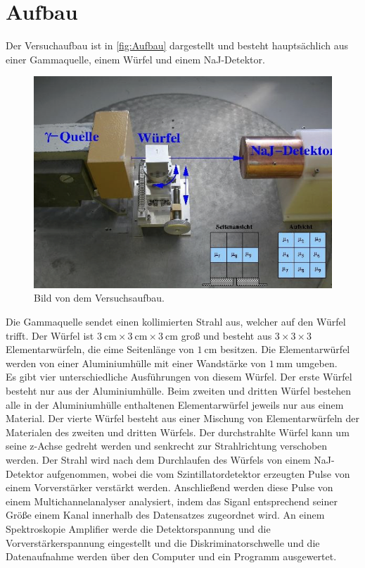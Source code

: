 \section{Aufbau}
\label{sec:Aufbau}
Der Versuchaufbau ist in \autoref{fig:Aufbau} dargestellt und besteht hauptsächlich aus einer Gammaquelle, einem Würfel und einem NaJ-Detektor.
\begin{figure}[H]
    \centering
    \includegraphics[scale=0.7]{Abbildungen/Aufbau.png}
    \caption{Bild von dem Versuchsaufbau.\cite{V14}}
    \label{fig:Aufbau}
\end{figure}
Die Gammaquelle sendet einen kollimierten Strahl aus, welcher auf den Würfel trifft. 
Der Würfel ist $\qty{3}{\centi\meter} \times \qty{3}{\centi\meter} \times \qty{3}{\centi\meter}$ groß und besteht aus $3 \times 3 \times 3$ Elementarwürfeln, die eime Seitenlänge
von $\qty{1}{\centi\meter}$ besitzen. Die Elementarwürfel werden von einer Aluminiumhülle mit einer Wandstärke von $\qty{1}{\milli\meter}$ umgeben.\\
Es gibt vier unterschiedliche Ausführungen von diesem Würfel. Der erste Würfel besteht nur aus der Aluminiumhülle.
Beim zweiten und dritten Würfel bestehen alle in der Aluminiumhülle enthaltenen Elementarwürfel jeweils nur aus einem Material. Der vierte Würfel besteht aus
einer Mischung von Elementarwürfeln der Materialen des zweiten und dritten Würfels.
Der durchstrahlte Würfel kann um seine z-Achse gedreht werden und senkrecht zur Strahlrichtung verschoben werden.
Der Strahl wird nach dem Durchlaufen des Würfels von einem NaJ-Detektor aufgenommen, wobei die vom Szintillatordetektor erzeugten Pulse von einem Vorverstärker verstärkt werden.
Anschließend werden diese Pulse von einem Multichannelanalyser analysiert, indem das Siganl entsprechend seiner Größe einem Kanal innerhalb des Datensatzes zugeordnet wird.
An einem Spektroskopie Amplifier werde die Detektorspannung und die Vorverstärkerspannung eingestellt und die Diskriminatorschwelle und die Datenaufnahme werden über den Computer und ein 
Programm ausgewertet.


